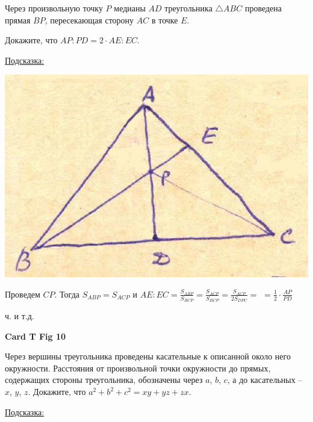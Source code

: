 \documentclass[12pt,a4paper]{article}
\begin{document}
Через произвольную точку $P$ медианы $AD$ треугольника $\bigtriangleup ABC$ проведена прямая $B P$, пересекающая сторону $AC$ в точке $E$.

Докажите, что $AP : PD=2\cdot A E : EC$.

\underline{Подсказка:}

\noindent \begin{minipage}{6cm}
	\includegraphics[width=\textwidth]{T_Fig_8.jpg}
\end{minipage}\quad 	
\begin{minipage}{7cm}
	Проведем $CP$. Тогда $S_{A B P}=S_{A C P}$ и $A E: E C=\frac{S_{A B P}}{S_{B C P}}=\frac{S_{A C P}}{S_{B C P}}= \frac{S_{A C P}}{2 S_{D P C}}=$
	$=\frac{1}{2}\cdot \frac{AP}{PD}$ 
	
	ч. и т.д.
\end{minipage}

\bigskip
{}
\noindent\textbf{Card T Fig 10}
\medskip
{}

Через вершины треугольника проведены касательные к описанной около него окружности. Расстояния от произвольной точки окружности до прямых, содержащих стороны треугольника, обозначены через $a$, $b$, $c$, а до касательных -- $x$, $y$, $z$. Докажите, что $a^2+b^2+c^2=xy+yz+zx$.

\underline{Подсказка:}
\end{document}
